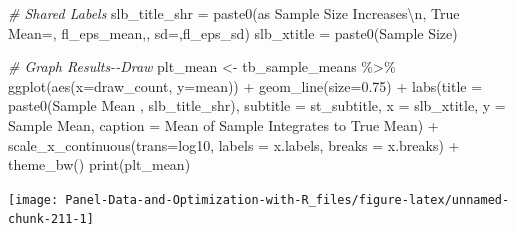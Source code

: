 \documentclass[
]{book}
\newenvironment{Shaded}{\begin{snugshade}}{\end{snugshade}}
\newcommand{\AttributeTok}[1]{\textcolor[rgb]{0.77,0.63,0.00}{#1}}
\newcommand{\CommentTok}[1]{\textcolor[rgb]{0.56,0.35,0.01}{\textit{#1}}}
\newcommand{\FloatTok}[1]{\textcolor[rgb]{0.00,0.00,0.81}{#1}}
\newcommand{\FunctionTok}[1]{\textcolor[rgb]{0.00,0.00,0.00}{#1}}
\newcommand{\NormalTok}[1]{#1}
\newcommand{\OtherTok}[1]{\textcolor[rgb]{0.56,0.35,0.01}{#1}}
\newcommand{\SpecialCharTok}[1]{\textcolor[rgb]{0.00,0.00,0.00}{#1}}
\newcommand{\StringTok}[1]{\textcolor[rgb]{0.31,0.60,0.02}{#1}}
\begin{document}
\begin{Shaded}
\begin{Highlighting}[]
\CommentTok{\# Shared Labels}
\NormalTok{slb\_title\_shr }\OtherTok{=} \FunctionTok{paste0}\NormalTok{(}\StringTok{\textquotesingle{}as Sample Size Increases}\SpecialCharTok{\textbackslash{}n}\StringTok{\textquotesingle{}}\NormalTok{,}
                       \StringTok{\textquotesingle{}True Mean=\textquotesingle{}}\NormalTok{, fl\_eps\_mean,}\StringTok{\textquotesingle{}, sd=\textquotesingle{}}\NormalTok{,fl\_eps\_sd)}
\NormalTok{slb\_xtitle }\OtherTok{=} \FunctionTok{paste0}\NormalTok{(}\StringTok{\textquotesingle{}Sample Size\textquotesingle{}}\NormalTok{)}

\CommentTok{\# Graph Results{-}{-}Draw}
\NormalTok{plt\_mean }\OtherTok{\textless{}{-}}\NormalTok{ tb\_sample\_means }\SpecialCharTok{\%\textgreater{}\%}
  \FunctionTok{ggplot}\NormalTok{(}\FunctionTok{aes}\NormalTok{(}\AttributeTok{x=}\NormalTok{draw\_count, }\AttributeTok{y=}\NormalTok{mean)) }\SpecialCharTok{+}
  \FunctionTok{geom\_line}\NormalTok{(}\AttributeTok{size=}\FloatTok{0.75}\NormalTok{) }\SpecialCharTok{+}
  \FunctionTok{labs}\NormalTok{(}\AttributeTok{title =} \FunctionTok{paste0}\NormalTok{(}\StringTok{\textquotesingle{}Sample Mean \textquotesingle{}}\NormalTok{, slb\_title\_shr),}
       \AttributeTok{subtitle =}\NormalTok{ st\_subtitle,}
       \AttributeTok{x =}\NormalTok{ slb\_xtitle,}
       \AttributeTok{y =} \StringTok{\textquotesingle{}Sample Mean\textquotesingle{}}\NormalTok{,}
       \AttributeTok{caption =} \StringTok{\textquotesingle{}Mean of Sample Integrates to True Mean\textquotesingle{}}\NormalTok{) }\SpecialCharTok{+}
  \FunctionTok{scale\_x\_continuous}\NormalTok{(}\AttributeTok{trans=}\StringTok{\textquotesingle{}log10\textquotesingle{}}\NormalTok{, }\AttributeTok{labels =}\NormalTok{ x.labels, }\AttributeTok{breaks =}\NormalTok{ x.breaks) }\SpecialCharTok{+}
  \FunctionTok{theme\_bw}\NormalTok{()}
\FunctionTok{print}\NormalTok{(plt\_mean)}
\end{Highlighting}
\end{Shaded}

\begin{center}\texttt{[image: Panel-Data-and-Optimization-with-R\_files/figure-latex/unnamed-chunk-211-1]} \end{center}
\end{document}
